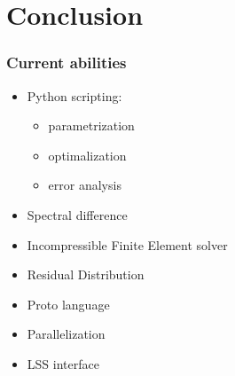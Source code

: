 \documentclass{beamer}
\begin{document}
\section{Conclusion}

\begin{frame}
 \frametitle{Current abilities}
\begin{itemize}
 \item Python scripting: 
  \begin{itemize}
   \item parametrization
   \item optimalization
   \item error analysis
  \end{itemize}
 \item Spectral difference
 \item Incompressible Finite Element solver
 \item Residual Distribution
 \item Proto language
 \item Parallelization
 \item LSS interface
\end{itemize}

\end{frame}
\end{document}
